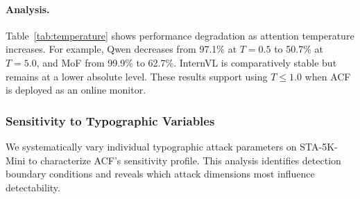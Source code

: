 \documentclass[preprint,12pt]{elsarticle}
\begin{document}
\paragraph{Analysis.} Table~\ref{tab:temperature} shows performance degradation as attention temperature increases. For example, Qwen decreases from 97.1\% at $T{=}0.5$ to 50.7\% at $T{=}5.0$, and MoF from 99.9\% to 62.7\%. InternVL is comparatively stable but remains at a lower absolute level. These results support using $T \le 1.0$ when ACF is deployed as an online monitor.

\subsubsection{Sensitivity to Typographic Variables}
\label{sec:ablation_variables}

We systematically vary individual typographic attack parameters on STA-5K-Mini to characterize ACF's sensitivity profile. This analysis identifies detection boundary conditions and reveals which attack dimensions most influence detectability.
\end{document}
